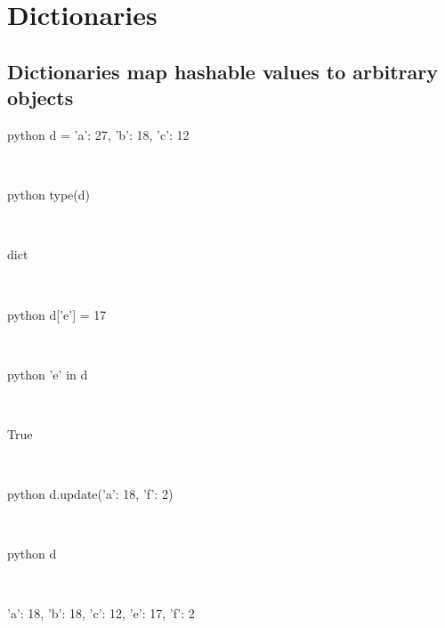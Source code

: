\documentclass[aspectratio=1610,slidestop]{beamer}
\begin{document}
\section{Dictionaries}

\subsection{Dictionaries map hashable values to arbitrary objects}
\begin{pframe}
 \begin{ipython}
  \begin{pythonin}{python}
d = {'a': 27, 'b': 18, 'c': 12}
  \end{pythonin}
  \\
  \begin{pythonin}{python}
type(d)
  \end{pythonin}
  \\
  \begin{pythonout}
dict
  \end{pythonout}
  \\

  \begin{pythonin}{python}
d['e'] = 17
  \end{pythonin}
  \\
  \begin{pythonin}{python}
'e' in d
  \end{pythonin}
  \\
  \begin{pythonout}
True
  \end{pythonout}
  \\

  \begin{pythonin}{python}
d.update({'a': 18, 'f': 2})
  \end{pythonin}
  \\
  \begin{pythonin}{python}
d
  \end{pythonin}
  \\
  \begin{pythonout}
{'a': 18, 'b': 18, 'c': 12, 'e': 17, 'f': 2}
  \end{pythonout}
 \end{ipython}
\end{pframe}
\end{document}
